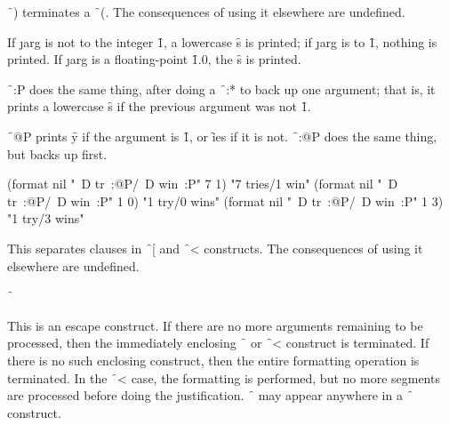 \f{~)} terminates a \f{~(}.
The consequences of using it elsewhere are undefined.

\endsubsubsection%



If \j{arg} is not  
to the integer \f{1}, a lowercase \f{s} is
printed; if \j{arg} is  to \f{1}, nothing is printed.  
If \j{arg} is a floating-point \f{1.0}, the \f{s} is
printed.

\f{~:P} does the same thing, 
after doing a \f{~:*} to back up one argument;
that is, it prints a lowercase \f{s} if the previous argument was not
\f{1}.  

\f{~@P} 
prints \f{y} if the argument is \f{1}, or \f{ies} if it is
not.  \f{~:@P} does the same thing, but backs up first.

\code
 (format nil "~D tr~:@P/~D win~:P" 7 1) \EV "7 tries/1 win"
 (format nil "~D tr~:@P/~D win~:P" 1 0) \EV "1 try/0 wins"
 (format nil "~D tr~:@P/~D win~:P" 1 3) \EV "1 try/3 wins"
\endcode

\endsubsubsection%

\endsubsection%




This separates clauses in \f{~[} and \f{~<} constructs.
The consequences of using it elsewhere are undefined.

\endsubsubsection%


{\f{~\hat }}

This is an escape construct.  If there are no more arguments remaining to
be processed, then the immediately           
enclosing \f{~\lbr  } or \f{~<} construct
is terminated.  If there is no such enclosing construct, then the entire
formatting operation is terminated.  
In the \f{~<} case, the formatting
is performed, but no more segments are processed before doing the
justification.     
\f{~\hat } may appear anywhere in a \f{~\lbr  }
construct.

